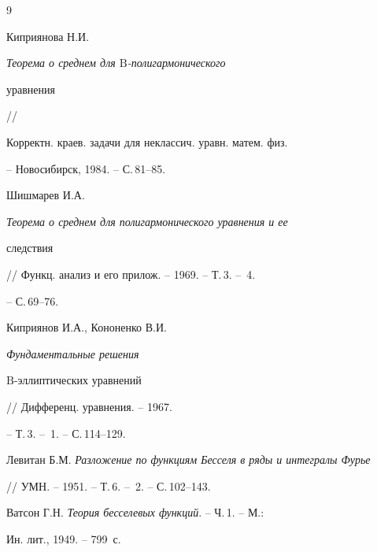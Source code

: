 \begin{thebibliography}{9}







Киприянова Н.И. {\em Теорема о среднем для $\mathrm B$-полигармонического


уравнения} //


Корректн. краев. задачи для неклассич. уравн. матем. физ.


-- Новосибирск, 1984. -- С.\,81--85.




Шишмарев И.А. {\em Теорема о среднем для полигармонического уравнения и ее


следствия} // Функц. анализ и его прилож. -- 1969. -- Т.\,3. -- \No\,4.


-- С.\,69--76.




Киприянов И.А., Кононенко В.И. {\em Фундаментальные решения


$\mathrm B$-эллиптических уравнений} // Дифференц. уравнения. -- 1967.


-- Т.\,3. -- \No\,1. -- С.\,114--129.




Левитан Б.М. {\em Разложение по функциям Бесселя в ряды и интегралы Фурье}


// УМН. -- 1951. -- Т.\,6. -- \No\,2. -- С.\,102--143.




Ватсон Г.Н. {\em Теория бесселевых функций}. -- Ч.\,1. -- М.:


Ин. лит., 1949. -- 799~с.













\end{thebibliography}





\vskip 2cm












\label{end}





